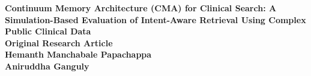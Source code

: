 \documentclass[12pt]{article}
\begin{document}
\begin{center}
  {\LARGE\bfseries Continuum Memory Architecture (CMA) for Clinical Search: A Simulation-Based Evaluation of Intent-Aware Retrieval Using Complex Public Clinical Data}\\[1.2em]
  {\large\bfseries Original Research Article}\\[2.5em]

  {\large\bfseries Hemanth Manchabale Papachappa}\\[1em]
  {\large\bfseries Aniruddha Ganguly}
\end{center}
\end{document}
